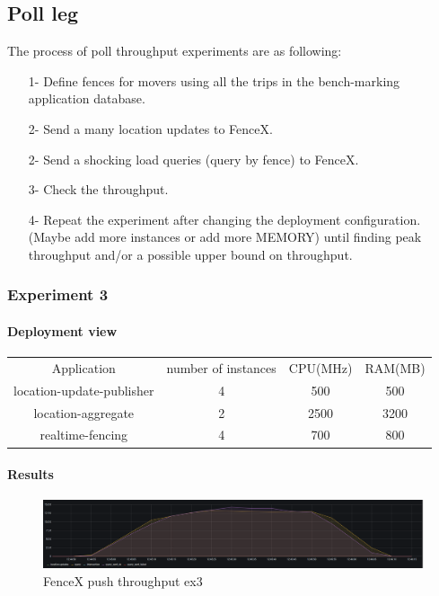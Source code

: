 \documentclass[a4]{report}
\begin{document}
    \subsection{Poll leg}
    The process of poll throughput experiments are as following:
    \begin{itemize}
        \item[1-] Define fences for movers using all the trips in the bench-marking application database.
        \item[2-] Send a many location updates to FenceX.
        \item[2-] Send a shocking load queries (query by fence) to FenceX.
        \item[3-] Check the throughput.
        \item[4-] Repeat the experiment after changing the deployment configuration. (Maybe add more instances or add
        more MEMORY) until finding peak throughput and/or a possible upper bound on throughput.
    \end{itemize}

    \subsubsection{Experiment 3}

    \paragraph{Deployment view}
    \begin{center}
        \begin{tabular}{ c c c c }
            Application               & number of instances & CPU(MHz) & RAM(MB) \\
            location-update-publisher & 4                   & 500      & 500     \\
            location-aggregate        & 2                   & 2500     & 3200    \\
            realtime-fencing          & 4                   & 700      & 800     \\
        \end{tabular}
    \end{center}

    \paragraph{Results}
    \begin{figure}[ht]
        \caption{FenceX push throughput ex3}
        \label{fig:ex3}
        \includegraphics[scale=0.4]{images/evaluation/ex3-benchmarking(16,9).png}
    \end{figure}
\end{document}

